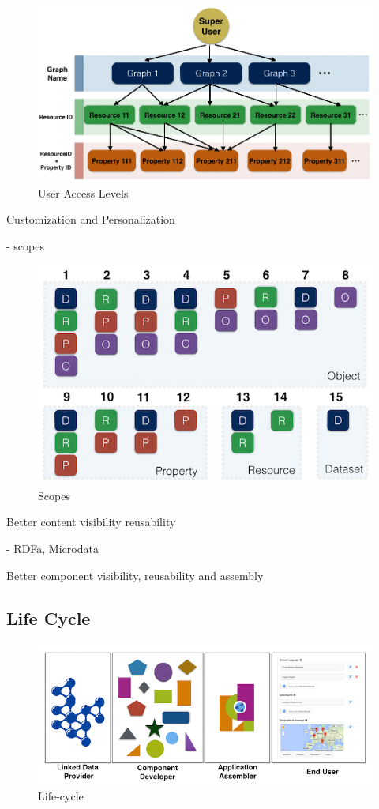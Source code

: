 \documentclass{acm_proc_article-sp}
\begin{document}
\begin{figure}[tb]
  \includegraphics[width=.9\linewidth]{images/userAccessLevels.jpg}
  \caption{User Access Levels}
\end{figure}


Customization and Personalization

- scopes

\begin{figure}[tb]
  \includegraphics[width=.9\linewidth]{images/scopes.jpg}
  \caption{Scopes}
\end{figure}

Better content visibility reusability

- RDFa, Microdata

Better component visibility, reusability and assembly


\subsection{Life Cycle}

\begin{figure}[tb]
  \includegraphics[width=1\linewidth]{images/lifecycle.jpg}
  \caption{Life-cycle}
\end{figure}
\end{document}
